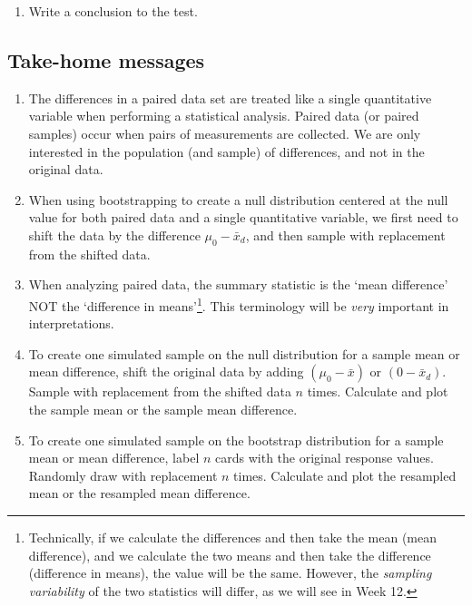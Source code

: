 \documentclass[
]{report}
\providecommand{\tightlist}{%
  \setlength{\itemsep}{0pt}\setlength{\parskip}{0pt}}
\begin{document}
\vspace{.7in}

\begin{enumerate}
\def\labelenumi{\arabic{enumi}.}
\setcounter{enumi}{10}
\tightlist
\item
  Write a conclusion to the test.
\end{enumerate}

\vspace{0.8in}

\subsection{Take-home messages}\label{take-home-messages-20}

\begin{enumerate}
\def\labelenumi{\arabic{enumi}.}
\item
  The differences in a paired data set are treated like a single quantitative variable when performing a statistical analysis. Paired data (or paired samples) occur when pairs of measurements are collected. We are only interested in the population (and sample) of differences, and not in the original data.
\item
  When using bootstrapping to create a null distribution centered at the null value for both paired data and a single quantitative variable, we first need to shift the data by the difference \(\mu_0 - \bar{x}_d\), and then sample with replacement from the shifted data.
\item
  When analyzing paired data, the summary statistic is the `mean difference' NOT the `difference in means'\footnote{Technically, if we calculate the differences and then take the mean (mean difference), and we calculate the two means and then take the difference (difference in means), the value will be the same. However, the \emph{sampling variability} of the two statistics will differ, as we will see in Week 12.}. This terminology will be \emph{very} important in interpretations.
\item
  To create one simulated sample on the null distribution for a sample mean or mean difference, shift the original data by adding \((\mu_0 - \bar{x})\) or \((0 - \bar{x}_d)\). Sample with replacement from the shifted data \(n\) times. Calculate and plot the sample mean or the sample mean difference.
\item
  To create one simulated sample on the bootstrap distribution for a sample mean or mean difference, label \(n\) cards with the original response values. Randomly draw with replacement \(n\) times. Calculate and plot the resampled mean or the resampled mean difference.
\end{enumerate}
\end{document}
